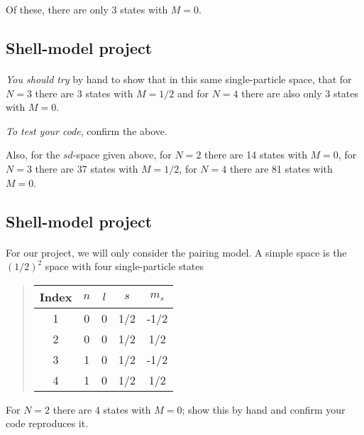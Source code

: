 \documentclass[%
oneside,                 %
final,                   %
10pt]{article}
\begin{document}
\noindent
Of these, there are only 3 states with $M=0$.



\subsection*{Shell-model project}

\paragraph{}
\emph{You should try} by hand to show that in this same single-particle space, that for 
$N=3$ there are 3 states with $M=1/2$ and for $N= 4$ there are also only 3 states with $M=0$. 

\emph{To test your code}, confirm the above. 

Also, 
for the $sd$-space given above, for $N=2$ there are 14 states with $M=0$, for $N=3$ there are 37 
states with $M=1/2$, for $N=4$ there are 81 states with $M=0$.



\subsection*{Shell-model project}

\paragraph{}
For our project, we will only consider the pairing model.
A simple space is the $(1/2)^2$ space with four single-particle states


\begin{quote}
\begin{tabular}{ccccc}
\hline
\multicolumn{1}{c}{ Index } & \multicolumn{1}{c}{ $n$ } & \multicolumn{1}{c}{ $l$ } & \multicolumn{1}{c}{ $s$ } & \multicolumn{1}{c}{ $m_s$ } \\
\hline
1     & 0   & 0   & 1/2 & -1/2  \\
2     & 0   & 0   & 1/2 & 1/2   \\
3     & 1   & 0   & 1/2 & -1/2  \\
4     & 1   & 0   & 1/2 & 1/2   \\
\hline
\end{tabular}
\end{quote}

\noindent
For $N=2$ there are 4 states with $M=0$; show this by hand and confirm your code reproduces it.
\end{document}

